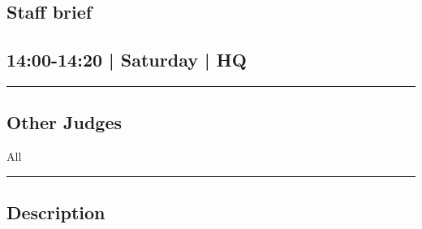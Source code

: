 \documentclass[10pt, A5]{article}
\begin{document}
		\begin{framed}
			\begin{minipage}{\textwidth}

			\setcounter{section}{44}
							\section{Staff brief}
						
			\subsection*{14:00-14:20 | Saturday | HQ}

			\vspace{0.25cm}
			\hrule
			\vspace{0.25cm}


			\subsection*{Other Judges}
							All

					\vspace{0.25cm}
			\hrule
			\vspace{0.25cm}

			\begin{minipage}{\textwidth}
			\subsection*{\faListAlt \: Description}
			
			\end{minipage}


	\end{minipage}
	\end{framed}

	
\end{document}
